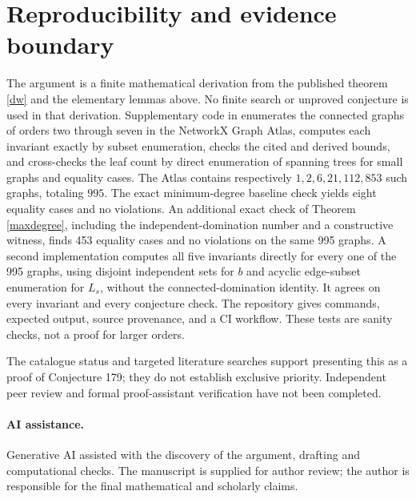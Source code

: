 \documentclass[11pt,a4paper]{article}
\begin{document}
\section{Reproducibility and evidence boundary}
The argument is a finite mathematical derivation from the published theorem \eqref{dw} and the elementary lemmas above. No finite search or unproved conjecture is used in that derivation. Supplementary code in \cite{repo} enumerates the connected graphs of orders two through seven in the NetworkX Graph Atlas, computes each invariant exactly by subset enumeration, checks the cited and derived bounds, and cross-checks the leaf count by direct enumeration of spanning trees for small graphs and equality cases. The Atlas contains respectively $1,2,6,21,112,853$ such graphs, totaling $995$. The exact minimum-degree baseline check yields eight equality cases and no violations. An additional exact check of Theorem \ref{maxdegree}, including the independent-domination number and a constructive witness, finds 453 equality cases and no violations on the same 995 graphs. A second implementation computes all five invariants directly for every one of the 995 graphs, using disjoint independent sets for $b$ and acyclic edge-subset enumeration for $L_s$, without the connected-domination identity. It agrees on every invariant and every conjecture check. The repository gives commands, expected output, source provenance, and a CI workflow. These tests are sanity checks, not a proof for larger orders.

The catalogue status and targeted literature searches support presenting this as a proof of Conjecture 179; they do not establish exclusive priority. Independent peer review and formal proof-assistant verification have not been completed.

\paragraph{AI assistance.} Generative AI assisted with the discovery of the argument, drafting and computational checks. The manuscript is supplied for author review; the author is responsible for the final mathematical and scholarly claims.
\end{document}
